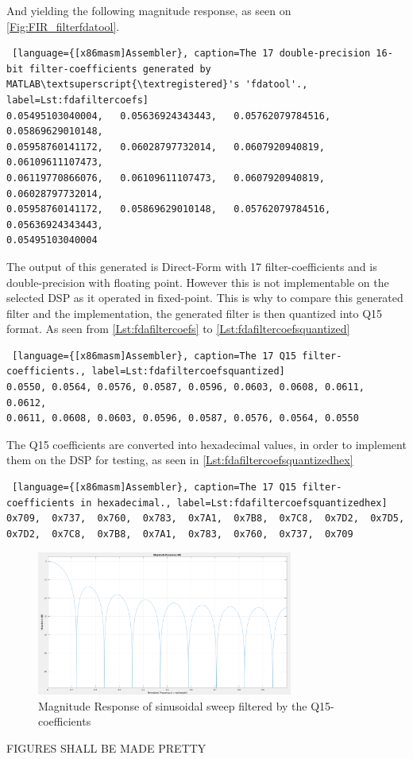 And yielding the following magnitude response, as seen on \autoref{Fig:FIR_filterfdatool}.

\begin{lstlisting} [language={[x86masm]Assembler}, caption=The 17 double-precision 16-bit filter-coefficients generated by MATLAB\textsuperscript{\textregistered}'s 'fdatool'., label=Lst:fdafiltercoefs]
0.05495103040004,	0.05636924343443,	0.05762079784516,	0.05869629010148,
0.05958760141172,	0.06028797732014,	0.0607920940819,	0.06109611107473,
0.06119770866076,	0.06109611107473,	0.0607920940819,	0.06028797732014,
0.05958760141172,	0.05869629010148,	0.05762079784516,	0.05636924343443,
0.05495103040004
\end{lstlisting}


The output of this generated is Direct-Form with 17 filter-coefficients and is double-precision with floating point. However this is not implementable on the selected DSP as it operated in fixed-point. This is why to compare this generated filter and the implementation, the generated filter is then quantized into Q15 format. As seen from \autoref{Lst:fdafiltercoefs} to \autoref{Lst:fdafiltercoefsquantized}

\begin{lstlisting} [language={[x86masm]Assembler}, caption=The 17 Q15 filter-coefficients., label=Lst:fdafiltercoefsquantized]
0.0550,	0.0564,	0.0576,	0.0587,	0.0596,	0.0603,	0.0608,	0.0611,	0.0612,
0.0611,	0.0608,	0.0603,	0.0596,	0.0587,	0.0576,	0.0564,	0.0550
\end{lstlisting}

The Q15 coefficients are converted into hexadecimal values, in order to implement them on the DSP for testing, as seen in \autoref{Lst:fdafiltercoefsquantizedhex} 

\begin{lstlisting} [language={[x86masm]Assembler}, caption=The 17 Q15 filter-coefficients in hexadecimal., label=Lst:fdafiltercoefsquantizedhex]
0x709,	0x737,	0x760,	0x783,	0x7A1,	0x7B8,	0x7C8,	0x7D2,	0x7D5,
0x7D2,	0x7C8,	0x7B8,	0x7A1,	0x783,	0x760,	0x737,	0x709
\end{lstlisting}

\begin{figure} [H]
	\centering
	\includegraphics[width=0.75\textwidth]{../Journal/Code/Test/FVrealization}
	\caption{Magnitude Response of sinusoidal sweep filtered by the Q15-coefficients}
	\label{Fig:FIR_filterfvtool}
\end{figure}

FIGURES SHALL BE MADE PRETTY


